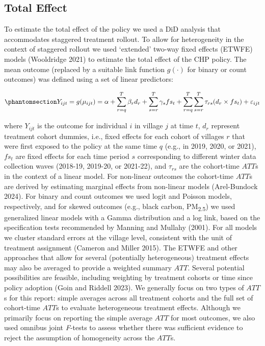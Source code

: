 \documentclass[
  letterpaper,
  DIV=11,
  numbers=noendperiod]{scrartcl}
\begin{document}
\subsection{Total Effect}\label{total-effect}

To estimate the total effect of the policy we used a DiD analysis that
accommodates staggered treatment rollout. To allow for heterogeneity in
the context of staggered rollout we used `extended' two-way fixed
effects (ETWFE) models (Wooldridge 2021) to estimate the total effect of
the CHP policy. The mean outcome (replaced by a suitable link function
\(g(\cdot)\) for binary or count outcomes) was defined using a set of
linear predictors:

\begin{equation}\phantomsection\label{eq-etwfe}{Y_{ijt}=g(\mu_{ijt}) = \alpha + \sum_{r=q}^{T} \beta_{r} d_{r} + \sum_{s=r}^{T} \gamma_{s} fs_{t}+ \sum_{r=q}^{T} \sum_{s=r}^{T} \tau_{rs} (d_{r} \times fs_{t}) + \varepsilon_{ijt}}\end{equation}

where \(Y_{ijt}\) is the outcome for individual \(i\) in village \(j\)
at time \(t\), \(d_{r}\) represent treatment cohort dummies, i.e., fixed
effects for each cohort of villages \(r\) that were first exposed to the
policy at the same time \(q\) (e.g., in 2019, 2020, or 2021), \(fs_{t}\)
are fixed effects for each time period \(s\) corresponding to different
winter data collection waves (2018-19, 2019-20, or 2021-22), and
\(\tau_{rs}\) are the cohort-time \(ATT\)s in the context of a linear
model. For non-linear outcomes the cohort-time \(ATT\)s are derived by
estimating marginal effects from non-linear models (Arel-Bundock 2024).
For binary and count outcomes we used logit and Poisson models,
respectively, and for skewed outcomes (e.g., black carbon,
PM\textsubscript{2.5}) we used generalized linear models with a Gamma
distribution and a log link, based on the specification tests
recommended by Manning and Mullahy (2001). For all models we cluster
standard errors at the village level, consistent with the unit of
treatment assignment (Cameron and Miller 2015). The ETWFE and other
approaches that allow for several (potentially heterogeneous) treatment
effects may also be averaged to provide a weighted summary \(ATT\).
Several potential possibilities are feasible, including weighting by
treatment cohorts or time since policy adoption (Goin and Riddell 2023).
We generally focus on two types of \(ATT\)s for this report: simple
averages across all treatment cohorts and the full set of cohort-time
\(ATT\)s to evaluate heterogeneous treatment effects. Although we
primarily focus on reporting the simple average \(ATT\) for most
outcomes, we also used omnibus joint \emph{F}-tests to assess whether
there was sufficient evidence to reject the assumption of homogeneity
across the \(ATT\)s.
\end{document}
